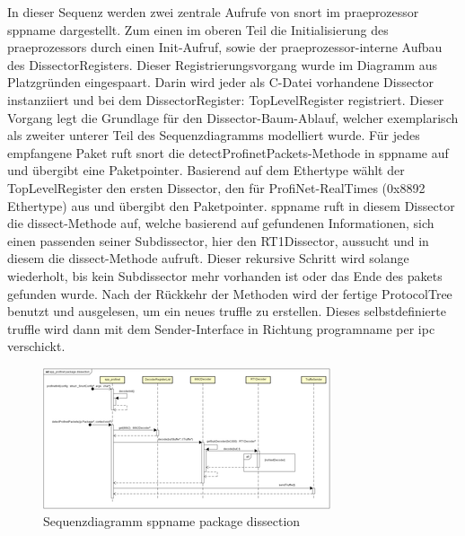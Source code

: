 
In dieser Sequenz werden zwei zentrale Aufrufe von \gls{snort} im \gls{praeprozessor} \gls{sppname} dargestellt. Zum einen im oberen Teil die Initialisierung des \gls{praeprozessor}s durch einen Init-Aufruf, sowie der \gls{praeprozessor}-interne Aufbau des DissectorRegisters. Dieser Registrierungsvorgang wurde im Diagramm aus Platzgründen eingespaart. Darin wird jeder als C-Datei vorhandene Dissector instanziiert und bei dem DissectorRegister: TopLevelRegister registriert. Dieser Vorgang legt die Grundlage für den Dissector-Baum-Ablauf, welcher exemplarisch als zweiter unterer Teil des Sequenzdiagramms modelliert wurde. Für jedes empfangene Paket ruft \gls{snort} die detectProfinetPackets-Methode in \gls{sppname} auf und übergibt eine Paketpointer. Basierend auf dem Ethertype wählt der TopLevelRegister den ersten Dissector, den für ProfiNet-RealTimes (0x8892 Ethertype) aus und übergibt den Paketpointer. \gls{sppname} ruft in diesem Dissector die dissect-Methode auf, welche basierend auf gefundenen Informationen, sich einen passenden seiner Subdissector, hier den RT1Dissector, aussucht und in diesem die dissect-Methode aufruft. Dieser rekursive Schritt wird solange wiederholt, bis kein Subdissector mehr vorhanden ist oder das Ende des \gls{paket}s gefunden wurde.
Nach der Rückkehr der Methoden wird der fertige ProtocolTree benutzt und ausgelesen, um ein neues \gls{truffle} zu erstellen. Dieses selbstdefinierte \gls{truffle} wird dann mit dem Sender-Interface in Richtung \gls{programname} per \gls{ipc} verschickt.

\begin{figure}[H]
  \centering
  \includegraphics[width=\textwidth]{../diagramimages/spp-profinet-package-dissection.png}
  \caption[Sequenzdiagramm \gls{sppname} package dissection]{Sequenzdiagramm \gls{sppname} package dissection}
\end{figure} 